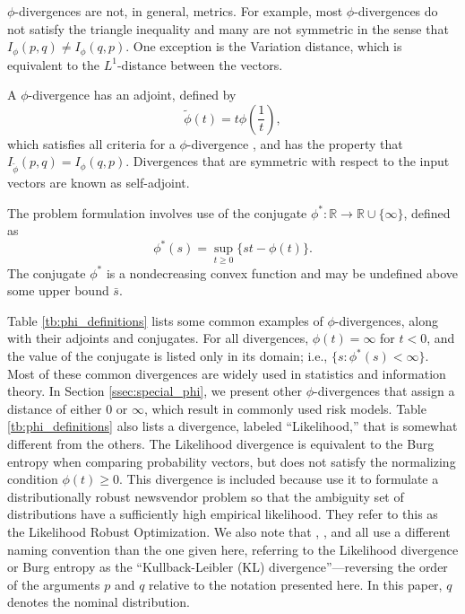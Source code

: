 \documentclass[opre,nonblindrev]{informs3} %
\newcommand{\R}{{\mathbb{R}}}
\begin{document}
$\phi$-divergences are not, in general, metrics.
For example, most $\phi$-divergences do not satisfy the triangle inequality and many are not symmetric in the sense that $I_\phi(p,q) \neq I_\phi(q,p)$.
One exception is the Variation distance, which is equivalent to the $L^1$-distance between the vectors.

A $\phi$-divergence has an adjoint, defined by
\begin{equation} \label{eq:adjoint}
	\tilde{\phi}(t) = t \phi\left(\frac{1}{t}\right),
\end{equation}
which satisfies all criteria for a $\phi$-divergence \citep{bental1991certainty}, and has the property that $I_{\tilde{\phi}}(p,q) = I_\phi(q,p)$.
Divergences that are symmetric with respect to the input vectors are known as self-adjoint.

The problem formulation involves use of the conjugate $\phi^* : \R \rightarrow \R \cup \{\infty\}$, defined as
\begin{equation} \label{eq:conjugate}
	\phi^*(s) = \sup_{t \geq 0} \{st - \phi(t)\}.
\end{equation}
The conjugate $\phi^*$ is a nondecreasing convex function and may be undefined above some upper bound $\bar{s}$.

Table \ref{tb:phi_definitions} lists some common examples of $\phi$-divergences, along with their adjoints and conjugates.
For all divergences, $\phi(t) = \infty$ for $t < 0$, and the value of the conjugate is listed only in its domain; i.e., $\{s : \phi^*(s) < \infty\}$.
Most of these common divergences are widely used in statistics and information theory.
In Section \ref{ssec:special_phi}, we present other $\phi$-divergences that assign a distance of either $0$ or $\infty$, which result in commonly used risk models.
Table \ref{tb:phi_definitions} also lists a divergence, labeled ``Likelihood,'' that is somewhat different from the others.
The Likelihood divergence is equivalent to the Burg entropy when comparing probability vectors, but does not satisfy the normalizing condition $\phi(t) \geq 0$.
This divergence is included because \cite{wang2010likelihood} use it to formulate a distributionally robust newsvendor problem so that the ambiguity set of distributions have a sufficiently high empirical likelihood. 
They refer to this as the Likelihood Robust Optimization. 
We also note that \cite{calafiore2007ambiguous}, \cite{hukullback}, and \cite{wang2010likelihood} all use a different naming convention than the one given here, referring to the Likelihood divergence or Burg entropy as the ``Kullback-Leibler (KL) divergence''---reversing the order of the arguments $p$ and $q$ relative to the notation presented here.
In this paper, $q$ denotes the nominal distribution. 
\end{document}
